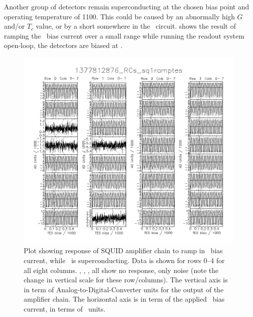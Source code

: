 Another group of detectors remain superconducting at the chosen bias point and operating temperature of \SI{1100}{\mK}.
This could be caused by an abnormally high $G$ and/or $T_c$ value, or by a short somewhere in the \TES\ circuit.
 shows the result of ramping the \TES\ bias current over a small range while running the readout system open-loop, the detectors are biased at \SOC.

\begin{figure}
\centering
\includegraphics[width=\textwidth]{./images/1377812876_RCs_sq1ramptes_00.png}
\caption{Plot showing response of SQUID amplifier chain to ramp in \TES\ bias current, while \TES\ is superconducting.
  Data is shown for rows 0--4 for all eight columns.
  , , ,  all show no response, only noise (note the change in vertical scale for these row/columns).
  The vertical axis is in term of Analog-to-Digital-Converter units for the output of the \SQUID amplifier chain.
  The horizontal axis is in term of the applied \TES\ bias current, in terms of \DAC\ units.
}
\label{fig:tes-bias-ramp-sc}
\end{figure}

